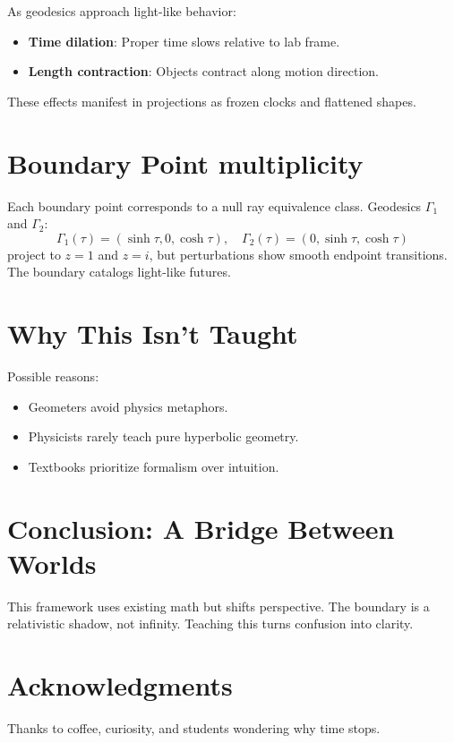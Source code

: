 \documentclass[10pt]{article}
\begin{document}
As geodesics approach light-like behavior:
\begin{itemize}
    \item \textbf{Time dilation}: Proper time slows relative to lab frame.
    \item \textbf{Length contraction}: Objects contract along motion direction.
\end{itemize}
These effects manifest in projections as frozen clocks and flattened shapes.

\section{Boundary Point multiplicity}

Each boundary point corresponds to a null ray equivalence class. Geodesics $\Gamma_1$ and $\Gamma_2$:
\begin{equation*}
\Gamma_1(\tau) = (\sinh\tau, 0, \cosh\tau), \quad \Gamma_2(\tau) = (0, \sinh\tau, \cosh\tau)
\end{equation*}
project to $z=1$ and $z=i$, but perturbations show smooth endpoint transitions. The boundary catalogs light-like futures.

\section{Why This Isn't Taught}

Possible reasons:
\begin{itemize}
    \item Geometers avoid physics metaphors.
    \item Physicists rarely teach pure hyperbolic geometry.
    \item Textbooks prioritize formalism over intuition.
\end{itemize}

\section{Conclusion: A Bridge Between Worlds}

This framework uses existing math but shifts perspective. The boundary is a relativistic shadow, not infinity. Teaching this turns confusion into clarity.

\section*{Acknowledgments}
Thanks to coffee, curiosity, and students wondering why time stops.
\end{document}
